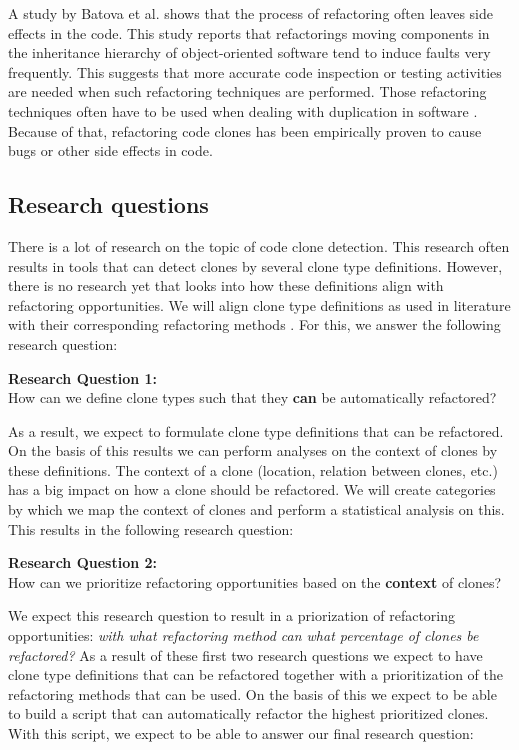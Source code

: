 A study by Batova et al. \cite{bavota2012does} shows that the process of refactoring often leaves side effects in the code. This study reports that refactorings moving components in the inheritance hierarchy of object-oriented software tend to induce faults very frequently. This suggests that more accurate code inspection or testing activities are needed when such refactoring techniques are performed. Those refactoring techniques often have to be used when dealing with duplication in software \cite{fowler2018refactoring, fontana2015duplicated}. Because of that, refactoring code clones has been empirically proven to cause bugs or other side effects in code.

\subsection{Research questions}
There is a lot of research on the topic of code clone detection. This research often results in tools that can detect clones by several clone type definitions. However, there is no research yet that looks into how these definitions align with refactoring opportunities. We will align clone type definitions as used in literature \cite{roy2007survey} with their corresponding refactoring methods \cite{fowler2018refactoring}. For this, we answer the following research question:
\begin{displayquote}
\textbf{Research Question 1:}\\How can we define clone types such that they \textbf{can} be automatically refactored?
\end{displayquote}
As a result, we expect to formulate clone type definitions that can be refactored. On the basis of this results we can perform analyses on the context of clones by these definitions. The context of a clone (location, relation between clones, etc.) has a big impact on how a clone should be refactored. We will create categories by which we map the context of clones and perform a statistical analysis on this. This results in the following research question:
\begin{displayquote}
\textbf{Research Question 2:}\\How can we prioritize refactoring opportunities based on the \textbf{context} of clones?
\end{displayquote}
We expect this research question to result in a priorization of refactoring opportunities: \textit{with what refactoring method can what percentage of clones be refactored?} As a result of these first two research questions we expect to have clone type definitions that can be refactored together with a prioritization of the refactoring methods that can be used. On the basis of this we expect to be able to build a script that can automatically refactor the highest prioritized clones. With this script, we expect to be able to answer our final research question:
